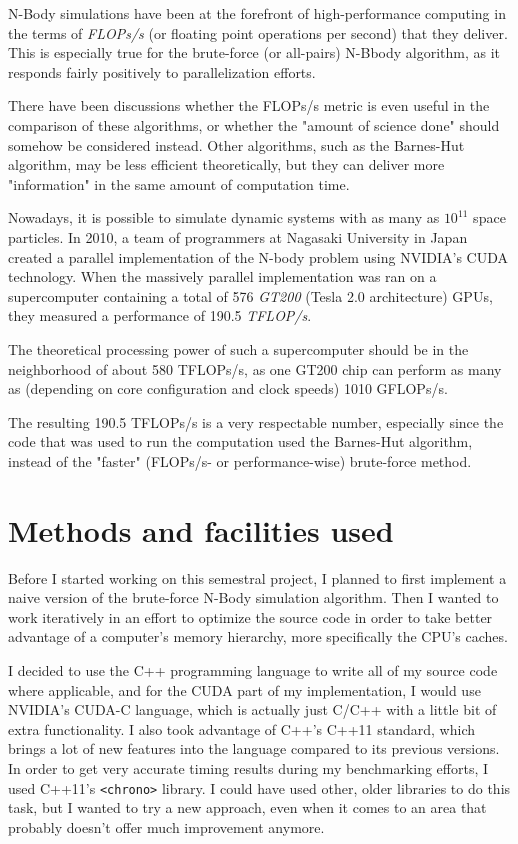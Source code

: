 \documentclass[journal]{IEEEtran}
\begin{document}
		N-Body simulations have been at the forefront of high-performance computing in the terms of \textit{FLOPs/s} (or floating point operations per second) that they deliver.\cite{history} This is especially true for the brute-force (or all-pairs) N-Bbody algorithm, as it responds fairly positively to parallelization efforts. 
		
		There have been discussions whether the FLOPs/s metric is even useful in the comparison of these algorithms, or whether the "amount of science done" should somehow be considered instead. Other algorithms, such as the Barnes-Hut algorithm, may be less efficient theoretically, but they can deliver more "information" in the same amount of computation time.
		
		Nowadays, it is possible to simulate dynamic systems with as many as $10^{11}$ space particles. In 2010, a team of programmers at Nagasaki University in Japan created a parallel implementation of the N-body problem using NVIDIA’s CUDA technology. When the massively parallel implementation was ran on a supercomputer containing a total of 576 \textit{GT200} (Tesla 2.0 architecture) GPUs, they measured a performance of 190.5 \textit{TFLOP/s}. \cite{teraflops}
		
		The theoretical processing power of such a supercomputer should be in the neighborhood of about 580 TFLOPs/s, as one GT200 chip can perform as many as (depending on core configuration and clock speeds) 1010 GFLOPs/s.\cite{wikitesla}
		
		The resulting 190.5 TFLOPs/s is a very respectable number, especially since the code that was used to run the computation used the Barnes-Hut algorithm, instead of the "faster" (FLOPs/s- or performance-wise) brute-force method.
		
	\section{Methods and facilities used}
	
		Before I started working on this semestral project, I planned to first implement a naive version of the brute-force N-Body simulation algorithm. Then I wanted to work iteratively in an effort to optimize the source code in order to take better advantage of a computer's memory hierarchy, more specifically the CPU's caches. 
		
		I decided to use the C++ programming language to write all of my source code where applicable, and for the CUDA part of my implementation, I would use NVIDIA's CUDA-C language, which is actually just C/C++ with a little bit of extra functionality. I also took advantage of C++'s C++11 standard, which brings a lot of new features into the language compared to its previous versions. In order to get very accurate timing results during my benchmarking efforts, I used C++11's \texttt{<chrono>} library. I could have used other, older libraries to do this task, but I wanted to try a new approach, even when it comes to an area that probably doesn't offer much improvement anymore.
		
\end{document}
